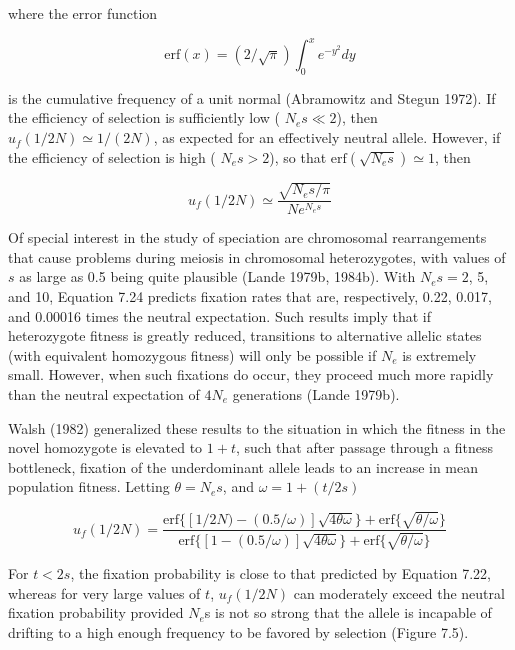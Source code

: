 \documentclass{article}
\begin{document}
where the error function

\begin{equation}
\mathrm{erf}(x)=(2/\sqrt{\pi})\int_{0}^{x}e^{-y^{2}}dy
\tag{7.23}
\label{eq:7_23}
\end{equation}

is the cumulative frequency of a unit normal (Abramowitz and Stegun 1972). If the efficiency of selection is sufficiently low ( $ N_e s \ll 2 $), then  $ u_f(1/2N) \simeq 1/(2N) $, as expected for an effectively neutral allele. However, if the efficiency of selection is high ( $ N_e s > 2 $), so that  $ \text{erf}(\sqrt{N_e s}) \simeq 1 $, then

\begin{equation}
u_{f}(1/2N)\simeq\frac{\sqrt{N_{e}s/\pi}}{N e^{N_{e}s}}
\tag{7.24}
\label{eq:7_24}
\end{equation}

Of special interest in the study of speciation are chromosomal rearrangements that cause problems during meiosis in chromosomal heterozygotes, with values of $s$ as large as 0.5 being quite plausible (Lande 1979b, 1984b). With $N_{e}s = 2$, 5, and 10, Equation 7.24 predicts fixation rates that are, respectively, 0.22, 0.017, and 0.00016 times the neutral expectation. Such results imply that if heterozygote fitness is greatly reduced, transitions to alternative allelic states (with equivalent homozygous fitness) will only be possible if $N_{e}$ is extremely small. However, when such fixations do occur, they proceed much more rapidly than the neutral expectation of $4N_{e}$ generations (Lande 1979b).

Walsh (1982) generalized these results to the situation in which the fitness in the novel homozygote is elevated to  $ 1+t $, such that after passage through a fitness bottleneck, fixation of the underdominant allele leads to an increase in mean population fitness. Letting  $ \theta = N_e s $, and  $ \omega = 1 + (t/2s) $

\begin{equation}
u_{f}(1/2N)=\frac{\mathrm{erf}\{[1/2N)-(0.5/\omega)]\sqrt{4\theta\omega}\}+\mathrm{erf}\{\sqrt{\theta/\omega}\}}{\mathrm{erf}\{[1-(0.5/\omega)]\sqrt{4\theta\omega}\}+\mathrm{erf}\{\sqrt{\theta/\omega}\}}
\tag{7.25}
\label{eq:7_25}
\end{equation}

For  $ t < 2s $, the fixation probability is close to that predicted by Equation 7.22, whereas for very large values of  $ t $,  $ u_f(1/2N) $ can moderately exceed the neutral fixation probability provided  $ N_e $s is not so strong that the allele is incapable of drifting to a high enough frequency to be favored by selection (Figure 7.5).
\end{document}
